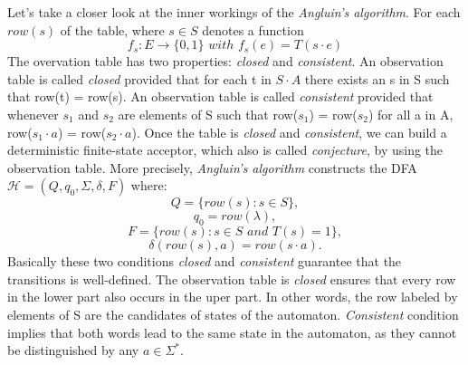 Let's take a closer look at the inner workings of the \textit{Angluin's algorithm}.
For each $row(s)$ of the table, where $s \in S$ denotes a function
\[
  f_s : E \rightarrow \lbrace 0, 1 \rbrace \,\, with \,\, f_s(e) = T(s \cdot e)  
\]
The overvation table has two properties: \textit{closed} and \textit{consistent}.
An observation table is called \textit{closed} provided that
for each t in $S \cdot A$ there exists an s in S 
such that row(t) = row(s).
An observation table is called \textit{consistent} provided that 
whenever $s_1$ and $s_2$ are elements of S such that
row($s_1$) = row($s_2$) for all a in A, 
row($s_1 \cdot a$) = row($s_2 \cdot a$).
Once the table is \textit{closed} and \textit{consistent}, we can build a deterministic finite-state acceptor,
which also is called \textit{conjecture}, by using the observation table.
More precisely, \textit{Angluin's algorithm} constructs the DFA 
$\mathcal{H} = (Q, q_0, \Sigma, \delta, F)$ where:
\[
  Q = \lbrace row(s): s \in S \rbrace,
\]
\[
  q_0 = row(\lambda),
\]
\[
  F = \lbrace row(s): s \in S \,\, and \,\, T(s)  = 1\rbrace,
\]
\[
  \delta(row(s),a) = row(s \cdot a).
\]
Basically these two conditions \textit{closed} and \textit{consistent} 
guarantee that the transitions is well-defined.
The observation table is \textit{closed} ensures that every row in the lower part also occurs in the uper part.
In other words, the row labeled by elements
of S are the candidates of states of the automaton.
\textit{Consistent} condition implies that both words lead to the same 
state in the automaton, as they cannot be distinguished by any $a \in \Sigma^*$.

